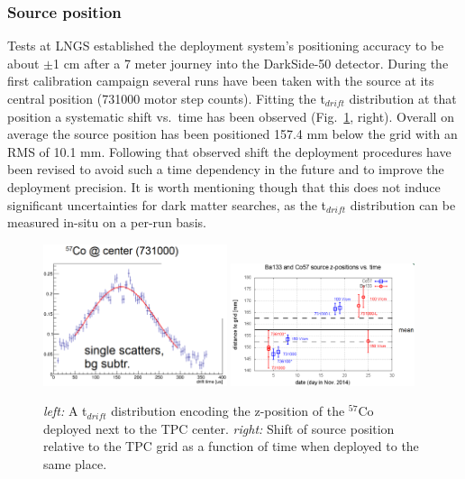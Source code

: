\subsubsection{Source position}
Tests at LNGS established the deployment system's positioning accuracy to be about $\pm$1 cm after a 7 meter journey into the DarkSide-50 detector.
During the first calibration campaign several runs have been taken with the source at its central position (731000 motor step counts). Fitting the t$_{drift}$ distribution at that position a systematic shift vs.~time has been observed (Fig.~\ref{fig:SourcePosition}, right). Overall on average the source position has been positioned 157.4 mm below the grid with an RMS of 10.1 mm. Following that observed shift the deployment procedures have been revised to avoid such a time dependency in the future and to improve the deployment precision. It is worth mentioning though that this does not induce significant uncertainties for dark matter searches, as the t$_{drift}$ distribution can be measured in-situ on a per-run basis.
\begin{figure}[htbp]
\centering
\includegraphics[width=0.48\textwidth]{./Figures/Tdrift_distribution_Co57_DocDB1288.png}
\includegraphics[width=0.48\textwidth]{./Figures/SourcePosition_vs_time_DocDB1288.png}
\caption{\textit{left:} A t$_{drift}$ distribution encoding the z-position of the $^{57}$Co deployed next to the TPC center.
\textit{right:} Shift of source position relative to the TPC grid as a function of time when deployed to the same place.
\label{fig:SourcePosition}} 
\end{figure}

